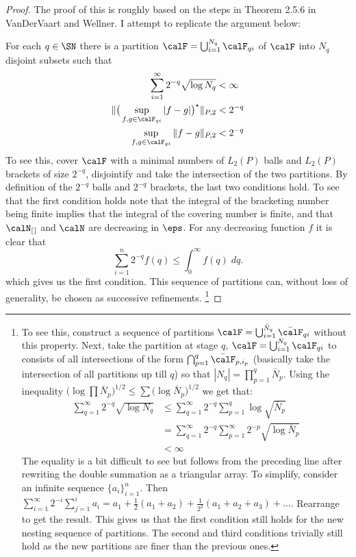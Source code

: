 \begin{proof}
	The proof of this is roughly based on the steps in Theorem 2.5.6 in VanDerVaart and Wellner. I attempt to replicate the argument below:

	For each \(q\in\SN\) there is a partition \(\calF = \bigcup_{i=1}^{N_q} \calF_{qi}\) of \(\calF\) into \(N_q\) disjoint subsets such that 
	\begin{align*}
		\sum_{i=1}^{\infty} 2^{-q} \sqrt{\log N_q} &< \infty \\	
		\|\big(\sup_{f,g\in\calF_{qi}}|f-g|\big)^\star\|_{P,2} &< 2^{-q} \\
		\sup_{f,g\in\calF_{qi}} \|f-g\|_{P,2} &< 2^{-q}
	\end{align*}
	To see this, cover \(\calF\) with a minimal numbers of \(L_2(P)\) balls and \(L_2(P)\) brackets of size \(2^{-q}\), disjointify and take the intersection of the two partitions. By definition of the \(2^{-q}\) balls and \(2^{-q}\) brackets, the last two conditions hold. To see that the first condition holds note that the integral of the bracketing number being finite implies that the integral of the covering number is finite, and that \(\calN_{[\hspace{0.1em}]}\) and \(\calN\) are decreasing in \(\eps\). For any decreasing function \(f\) it is clear that
	\[
		\sum_{i=1}^n 2^{-q} f(q) \leq \int_0^\infty f(q)\;dq
	.\]
	which gives us the first condition. This sequence of partitions can, without loss of generality, be chosen as successive refinements.
	\footnote{To see this, construct a sequence of partitions \(\calF = \bigcup_{i=1}^{\bar N_q} \bar\calF_{qi}\) without this property. Next, take the partition at stage \(q\), \(\calF = \bigcup_{i=1}^{N_q}\calF_{qi}\) to consists of all intersections of the form \(\bigcap_{p=1}^q \bar\calF_{p,i_p}\) (basically take the intersection of all partitions up till \(q\)) so that \(|N_q| = \prod_{p=1}^q \bar N_p\). Using the inequality \(\big(\log\prod\bar N_p\big)^{1/2} \leq \sum \big(\log \bar N_p\big)^{1/2}\)  we get that:
	\begin{align*}
		\sum_{q=1}^\infty 2^{-q} \sqrt{\log N_q} &\leq \sum_{q=1}^\infty 2^{-q} \sum_{p=1}^q \log \sqrt{\bar N_p} \\
												 &= \sum_{q=1}^\infty 2^{-q} \sum_{p=1}^\infty 2^{-p}\sqrt{\log \bar N_p}\\
												 &< \infty
	\end{align*}
	The equality is a bit difficult to see but follows from the preceding line after rewriting the double summation as a triangular array. To simplify, consider an infinite sequence \(\{a_i\}_{i=1}^n\). Then \(\sum_{i=1}^\infty 2^{-i} \sum_{j=1}^i a_i  = a_1 + \frac{1}{2}(a_1 + a_2) + \frac{1}{2^{2}}(a_1 + a_2 + a_3) + \dots\). Rearrange to get the result. This gives us that the first condition still holds for the new nesting sequence of partitions. The second and third conditions trivially still hold as the new partitions are finer than the previous ones.  
	}


\end{proof}
